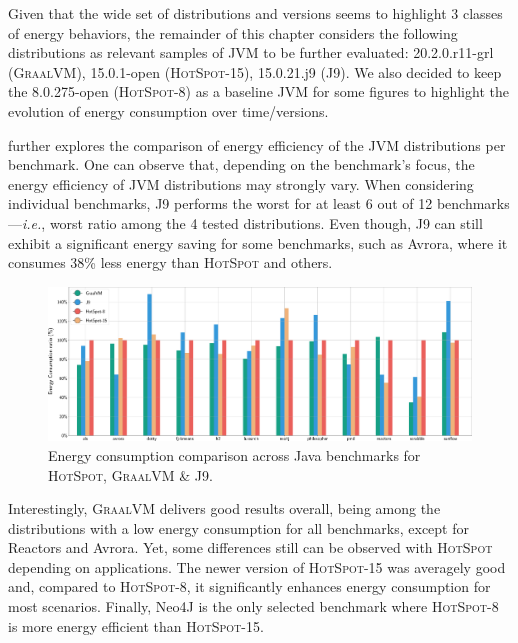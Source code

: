 
Given that the wide set of distributions and versions seems to highlight 3 classes of energy behaviors, the remainder of this chapter considers the following distributions as relevant samples of JVM to be further evaluated: \textsf{20.2.0.r11-grl} (\textsc{GraalVM}), \textsf{15.0.1-open} (\textsc{HotSpot-15}), \textsf{15.0.21.j9} (\textsc{J9}).
We also decided to keep the \textsf{8.0.275-open} (\textsc{HotSpot-8}) as a baseline JVM for some figures to highlight the evolution of energy consumption over time/versions.

 further explores the comparison of energy efficiency of the JVM distributions per benchmark.
One can observe that, depending on the benchmark's focus, the energy efficiency of JVM distributions may strongly vary.
When considering individual benchmarks, \textsc{J9} performs the worst for at least 6 out of 12 benchmarks---\emph{i.e.}, worst ratio among the 4 tested distributions.
Even though, \textsc{J9} can still exhibit a significant energy saving for some benchmarks, such as \textsf{Avrora}, where it consumes 38\% less energy than \textsc{HotSpot} and others.

\begin{figure}%
    \includegraphics[width=.87\linewidth]{imgs/bar_plot_all_basedon8}
    \centering
    \captionsetup{justification=centering}
    \caption{Energy consumption comparison across Java benchmarks for \textsc{HotSpot}, \textsc{GraalVM} \& \textsc{J9}.}
    \label{fig:all_benchs}
\end{figure}

Interestingly, \textsc{GraalVM} delivers good results overall, being among the distributions with a low energy consumption for all benchmarks, except for \textsf{Reactors} and \textsf{Avrora}.
Yet, some differences still can be observed with \textsc{HotSpot} depending on applications.
The newer version of \textsc{HotSpot-15} was averagely good and, compared to \textsc{HotSpot-8}, it significantly enhances energy consumption for most scenarios.
Finally, \textsf{Neo4J} is the only selected benchmark where \textsc{HotSpot-8} is more energy efficient than \textsc{HotSpot-15}.


